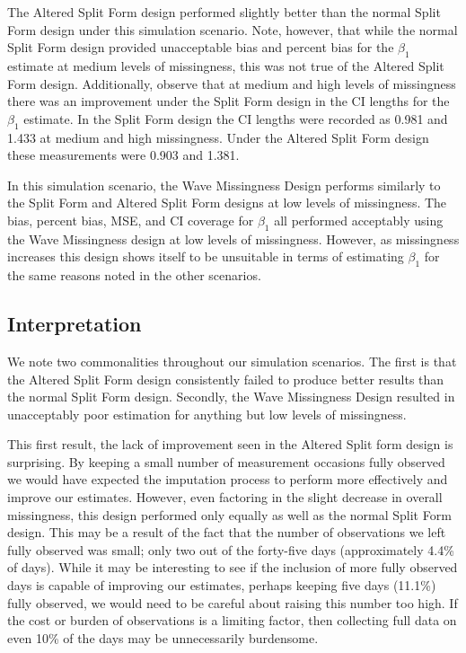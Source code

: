 \documentclass{svjour3}                     %
\begin{document}
The Altered Split Form design performed slightly better than the normal Split Form design under this simulation scenario. Note, however, that while the normal Split Form design provided unacceptable bias and percent bias for the $\beta_1$ estimate at medium levels of missingness, this was not true of the Altered Split Form design. Additionally, observe that at medium and high levels of missingness there was an improvement under the Split Form design in the CI lengths for the $\beta_1$ estimate. In the Split Form design the CI lengths were recorded as 0.981 and 1.433 at medium and high missingness. Under the Altered Split Form design these measurements were 0.903 and 1.381. \par

In this simulation scenario, the Wave Missingness Design performs similarly to the Split Form and Altered Split Form designs at low levels of missingness. The bias, percent bias, MSE, and CI coverage for $\beta_1$ all performed acceptably using the Wave Missingness design at low levels of missingness. However, as missingness increases this design shows itself to be unsuitable in terms of estimating $\beta_1$ for the same reasons noted in the other scenarios. \par

\subsection{Interpretation}
\label{sec:3.5}
We note two commonalities throughout our simulation scenarios. The first is that the Altered Split Form design consistently failed to produce better results than the normal Split Form design. Secondly, the Wave Missingness Design resulted in unacceptably poor estimation for anything but low levels of missingness. \par

This first result, the lack of improvement seen in the Altered Split form design is surprising. By keeping a small number of measurement occasions fully observed we would have expected the imputation process to perform more effectively and improve our estimates. However, even factoring in the slight decrease in overall missingness, this design performed only equally as well as the normal Split Form design. This may be a result of the fact that the number of observations we left fully observed was small; only two out of the forty-five days (approximately 4.4\% of days). While it may be interesting to see if the inclusion of more fully observed days is capable of improving our estimates, perhaps keeping five days (11.1\%) fully observed, we would need to be careful about raising this number too high. If the cost or burden of observations is a limiting factor, then collecting full data on even 10\% of the days may be unnecessarily burdensome. \par
\end{document}
